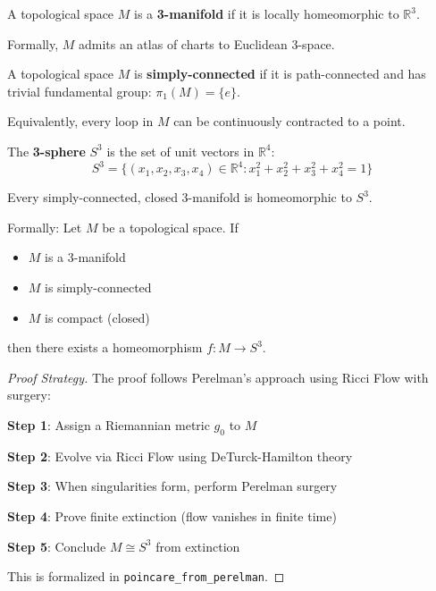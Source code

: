 \begin{definition}[3-Manifold]
\label{def:3manifold}
A topological space $M$ is a \textbf{3-manifold} if it is locally homeomorphic to $\mathbb{R}^3$.

Formally, $M$ admits an atlas of charts to Euclidean 3-space.
\end{definition}

\begin{definition}
\label{def:simply_connected}
A topological space $M$ is \textbf{simply-connected} if it is path-connected and has trivial fundamental group: $\pi_1(M) = \{e\}$.

Equivalently, every loop in $M$ can be continuously contracted to a point.
\end{definition}

\begin{definition}[3-Sphere]
\label{def:sphere3}
The \textbf{3-sphere} $S^3$ is the set of unit vectors in $\mathbb{R}^4$:
\[
S^3 = \{(x_1, x_2, x_3, x_4) \in \mathbb{R}^4 : x_1^2 + x_2^2 + x_3^2 + x_4^2 = 1\}
\]
\end{definition}

\begin{theorem}
\label{thm:poincare_conjecture}
\leanok
Every simply-connected, closed 3-manifold is homeomorphic to $S^3$.

Formally: Let $M$ be a topological space. If
\begin{itemize}
\item $M$ is a 3-manifold
\item $M$ is simply-connected
\item $M$ is compact (closed)
\end{itemize}
then there exists a homeomorphism $f : M \to S^3$.
\end{theorem}

\begin{proof}[Proof Strategy]
The proof follows Perelman's approach using Ricci Flow with surgery:

\textbf{Step 1}: Assign a Riemannian metric $g_0$ to $M$

\textbf{Step 2}: Evolve via Ricci Flow using DeTurck-Hamilton theory

\textbf{Step 3}: When singularities form, perform Perelman surgery

\textbf{Step 4}: Prove finite extinction (flow vanishes in finite time)

\textbf{Step 5}: Conclude $M \cong S^3$ from extinction

This is formalized in \texttt{poincare_from_perelman}.
\end{proof}

